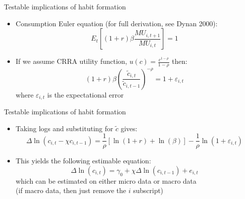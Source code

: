 \documentclass[10pt,english,t,10pt]{beamer}
\begin{document}
\begin{frame}{Testable implications of habit formation}

\begin{itemize}
	\item Consumption Euler equation (for full derivation, see Dynan 2000):
	\[
	E_t\left[(1+r) \beta \frac{MU_{i, t+1}}{MU_{i, t}}\right]=1
	\]
	\vfill 
	
	\pause
	\item If we assume CRRA utility function, $u(c) = \frac{c^{1-\rho}}{1-\rho}$ then:
	\[
	(1+r) \beta \left(\frac{\tilde{c}_{i, t}}{\tilde{c}_{i, t-1}}\right)^{-\rho}=1+\varepsilon_{i, t} 
	\]
	where $\varepsilon_{i, t} $ is the expectational error \vfill 
	

	
\end{itemize}

\end{frame}




\begin{frame}{Testable implications of habit formation}

\begin{itemize}
 
	\item Taking logs and substituting for $\tilde{c}$ gives:
	\[ 
	\Delta \ln \left(c_{i, t}-\chi c_{i, t-1}\right) 
	= \frac{1}{\rho}[\ln (1+r)+\ln (\beta)] -\frac{1}{\rho} \ln \left(1+\varepsilon_{i, t}\right) 
	\]
	\vfill 
	
	\pause
	\item This yields the following estimable equation:
	\[
	\Delta \ln \left(c_{i, t}\right)= \gamma_0+\chi \Delta \ln \left(c_{i, t-1}\right) +e_{i, t}
	\]
	which can be estimated on either micro data or macro data \\ (if macro data, then just remove the $i$ subscript)
	\vfill 
	


	
\end{itemize}

\end{frame}
\end{document}
